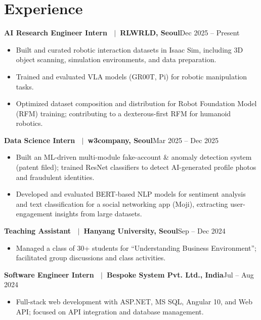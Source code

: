 \documentclass[10pt]{article}
\newcommand{\entry}[2]{\textbf{#1}\hfill{\color{muted}#2}\par}
\begin{document}
\section{Experience}
\entry{AI Research Engineer Intern \ $\vert$\ RLWRLD, Seoul}{Dec 2025 -- Present}
\begin{itemize}
    \item Built and curated robotic interaction datasets in Isaac Sim, including 3D object scanning, simulation environments, and data preparation.
    \item Trained and evaluated VLA models (GR00T, Pi) for robotic manipulation tasks.
    \item Optimized dataset composition and distribution for Robot Foundation Model (RFM) training; contributing to a dexterous-first RFM for humanoid robotics.
\end{itemize}
\vspace{1pt}
\entry{Data Science Intern \ $\vert$\ w3company, Seoul}{Mar 2025 -- Dec 2025}
\begin{itemize}
    \item Built an ML-driven multi-module fake-account \& anomaly detection system (patent filed); trained ResNet classifiers to detect AI-generated profile photos and fraudulent identities.
    \item Developed and evaluated BERT-based NLP models for sentiment analysis and text classification for a social networking app (Moji), extracting user-engagement insights from large datasets.
\end{itemize}
\vspace{1pt}
\entry{Teaching Assistant \ $\vert$\ Hanyang University, Seoul}{Sep -- Dec 2024}
\begin{itemize}
    \item Managed a class of 30+ students for ``Understanding Business Environment''; facilitated group discussions and class activities.
\end{itemize}
\vspace{1pt}
\entry{Software Engineer Intern \ $\vert$\ Bespoke System Pvt. Ltd., India}{Jul -- Aug 2024}
\begin{itemize}
    \item Full-stack web development with ASP.NET, MS SQL, Angular 10, and Web API; focused on API integration and database management.
\end{itemize}

\end{document}

